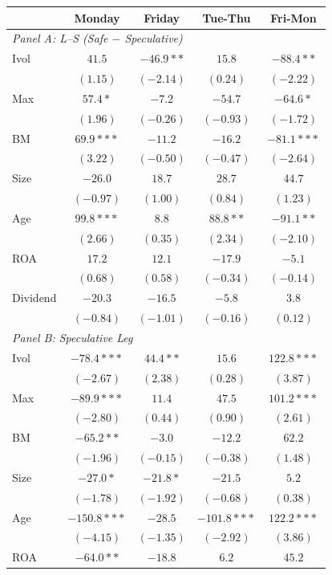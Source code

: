 \centering
\footnotesize
\begin{tabular}{l c c c c}
\toprule
 & Monday & Friday & Tue-Thu & Fri-Mon \\
\midrule
\multicolumn{5}{l}{\textit{Panel A: L--S (Safe $-$ Speculative)}} \\
Ivol & $41.5$ & $-46.9**$ & $15.8$ & $-88.4**$ \\
 & $(1.15)$ & $(-2.14)$ & $(0.24)$ & $(-2.22)$ \\
Max & $57.4*$ & $-7.2$ & $-54.7$ & $-64.6*$ \\
 & $(1.96)$ & $(-0.26)$ & $(-0.93)$ & $(-1.72)$ \\
BM & $69.9***$ & $-11.2$ & $-16.2$ & $-81.1***$ \\
 & $(3.22)$ & $(-0.50)$ & $(-0.47)$ & $(-2.64)$ \\
Size & $-26.0$ & $18.7$ & $28.7$ & $44.7$ \\
 & $(-0.97)$ & $(1.00)$ & $(0.84)$ & $(1.23)$ \\
Age & $99.8***$ & $8.8$ & $88.8**$ & $-91.1**$ \\
 & $(2.66)$ & $(0.35)$ & $(2.34)$ & $(-2.10)$ \\
ROA & $17.2$ & $12.1$ & $-17.9$ & $-5.1$ \\
 & $(0.68)$ & $(0.58)$ & $(-0.34)$ & $(-0.14)$ \\
Dividend & $-20.3$ & $-16.5$ & $-5.8$ & $3.8$ \\
 & $(-0.84)$ & $(-1.01)$ & $(-0.16)$ & $(0.12)$ \\
\midrule
\multicolumn{5}{l}{\textit{Panel B: Speculative Leg}} \\
Ivol & $-78.4***$ & $44.4**$ & $15.6$ & $122.8***$ \\
 & $(-2.67)$ & $(2.38)$ & $(0.28)$ & $(3.87)$ \\
Max & $-89.9***$ & $11.4$ & $47.5$ & $101.2***$ \\
 & $(-2.80)$ & $(0.44)$ & $(0.90)$ & $(2.61)$ \\
BM & $-65.2**$ & $-3.0$ & $-12.2$ & $62.2$ \\
 & $(-1.96)$ & $(-0.15)$ & $(-0.38)$ & $(1.48)$ \\
Size & $-27.0*$ & $-21.8*$ & $-21.5$ & $5.2$ \\
 & $(-1.78)$ & $(-1.92)$ & $(-0.68)$ & $(0.38)$ \\
Age & $-150.8***$ & $-28.5$ & $-101.8***$ & $122.2***$ \\
 & $(-4.15)$ & $(-1.35)$ & $(-2.92)$ & $(3.86)$ \\
ROA & $-64.0**$ & $-18.8$ & $6.2$ & $45.2$ \\

\end{tabular}

